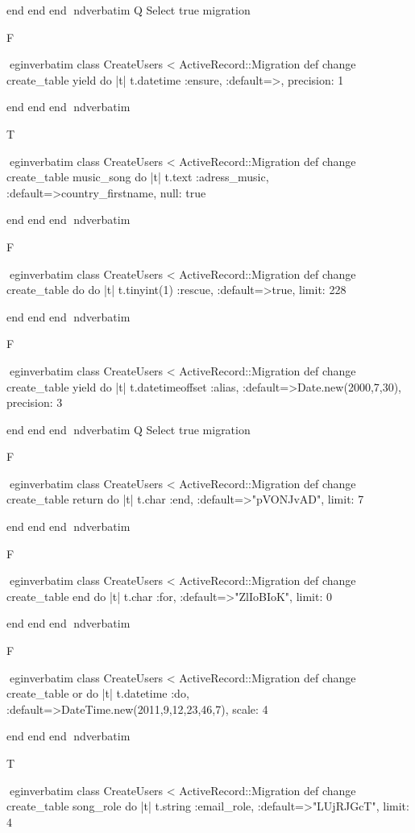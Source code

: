     end 
  end 
end
nd{verbatim}
Q
 Select true migration

F

egin{verbatim}
 class CreateUsers < ActiveRecord::Migration 
  def change 
    create_table yield do |t| 
      t.datetime :ensure, :default=>, precision: 1
    
    end 
  end 
end
nd{verbatim}

T

egin{verbatim}
 class CreateUsers < ActiveRecord::Migration 
  def change 
    create_table music_song do |t| 
      t.text :adress_music, :default=>country_firstname, null: true
    
    end 
  end 
end
nd{verbatim}

F

egin{verbatim}
 class CreateUsers < ActiveRecord::Migration 
  def change 
    create_table do do |t| 
      t.tinyint(1) :rescue, :default=>true, limit: 228
    
    end 
  end 
end
nd{verbatim}

F

egin{verbatim}
 class CreateUsers < ActiveRecord::Migration 
  def change 
    create_table yield do |t| 
      t.datetimeoffset :alias, :default=>Date.new(2000,7,30), precision: 3
    
    end 
  end 
end
nd{verbatim}
Q
 Select true migration

F

egin{verbatim}
 class CreateUsers < ActiveRecord::Migration 
  def change 
    create_table return do |t| 
      t.char :end, :default=>"pVONJvAD", limit: 7
    
    end 
  end 
end
nd{verbatim}

F

egin{verbatim}
 class CreateUsers < ActiveRecord::Migration 
  def change 
    create_table end do |t| 
      t.char :for, :default=>"ZlIoBIoK", limit: 0
    
    end 
  end 
end
nd{verbatim}

F

egin{verbatim}
 class CreateUsers < ActiveRecord::Migration 
  def change 
    create_table or do |t| 
      t.datetime :do, :default=>DateTime.new(2011,9,12,23,46,7), scale: 4
    
    end 
  end 
end
nd{verbatim}

T

egin{verbatim}
 class CreateUsers < ActiveRecord::Migration 
  def change 
    create_table song_role do |t| 
      t.string :email_role, :default=>"LUjRJGcT", limit: 4
    
